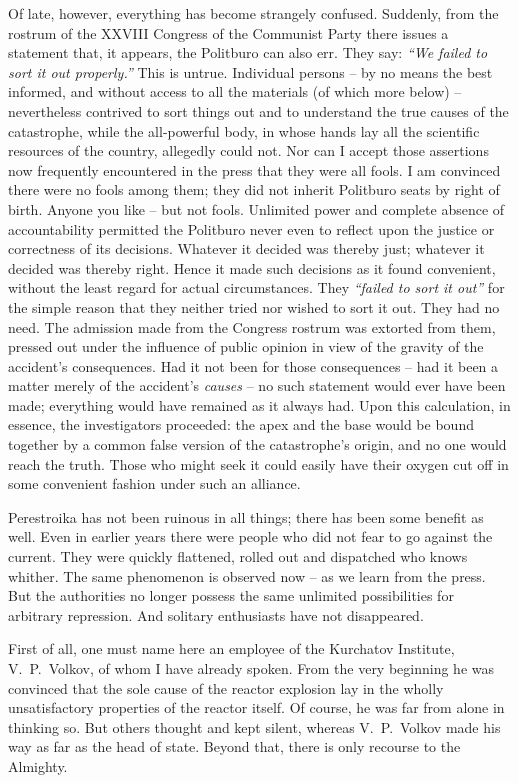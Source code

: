 \documentclass[openright]{bookest}
\begin{document}

Of late, however, everything has become strangely confused. Suddenly, from the rostrum of the XXVIII Congress of the Communist Party there issues a statement that, it appears, the Politburo can also err. They say: \textit{``We failed to sort it out properly.''} This is untrue. Individual persons -- by no means the best informed, and without access to all the materials (of which more below) -- nevertheless contrived to sort things out and to understand the true causes of the catastrophe, while the all-powerful body, in whose hands lay all the scientific resources of the country, allegedly could not. Nor can I accept those assertions now frequently encountered in the press that they were all fools. I am convinced there were no fools among them; they did not inherit Politburo seats by right of birth. Anyone you like -- but not fools. Unlimited power and complete absence of accountability permitted the Politburo never even to reflect upon the justice or correctness of its decisions. Whatever it decided was thereby just; whatever it decided was thereby right. Hence it made such decisions as it found convenient, without the least regard for actual circumstances. They \textit{``failed to sort it out''} for the simple reason that they neither tried nor wished to sort it out. They had no need. The admission made from the Congress rostrum was extorted from them, pressed out under the influence of public opinion in view of the gravity of the accident's consequences. Had it not been for those consequences -- had it been a matter merely of the accident's \textit{causes} -- no such statement would ever have been made; everything would have remained as it always had. Upon this calculation, in essence, the investigators proceeded: the apex and the base would be bound together by a common false version of the catastrophe's origin, and no one would reach the truth. Those who might seek it could easily have their oxygen cut off in some convenient fashion under such an alliance.

Perestroika has not been ruinous in all things; there has been some benefit as well. Even in earlier years there were people who did not fear to go against the current. They were quickly flattened, rolled out and dispatched who knows whither. The same phenomenon is observed now -- as we learn from the press. But the authorities no longer possess the same unlimited possibilities for arbitrary repression. And solitary enthusiasts have not disappeared.

First of all, one must name here an employee of the Kurchatov Institute, V.~P.~Volkov, of whom I have already spoken. From the very beginning he was convinced that the sole cause of the reactor explosion lay in the wholly unsatisfactory properties of the reactor itself. Of course, he was far from alone in thinking so. But others thought and kept silent, whereas V.~P.~Volkov made his way as far as the head of state. Beyond that, there is only recourse to the Almighty.
\end{document}
